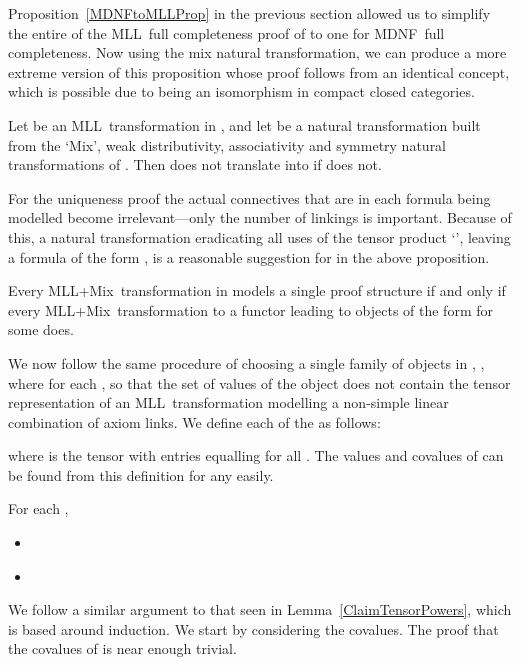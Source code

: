 \documentclass{LMCS}
\theoremstyle{plain}\newtheorem*{cLm}{Claim}
\newcommand{\mll}{MLL} \newcommand{\mall}{MALL}
\newcommand{\mllmix}{MLL+Mix} \newcommand{\GRel}{\mathbf{GRel}}
\newcommand{\p}{} \newcommand{\N}{\mathbb{N}}
\begin{document}
    \p Proposition~\ref{MDNFtoMLLProp} in the previous section allowed us to simplify the entire of the \mll~full completeness proof of  to one for MDNF~full completeness. Now using the mix natural transformation, we can produce a more extreme version of this proposition whose proof follows from an identical concept, which is possible due to  being an isomorphism in compact closed categories.
    \begin{prop} \label{MDNFMixToMLLProp}
    Let  be an \mll~transformation in , and let  be a natural transformation built from the `Mix', weak distributivity, associativity and symmetry natural transformations of . Then  does not translate into  if  does not.
    \end{prop}
    
    For the uniqueness proof the actual connectives that are in each formula being modelled become irrelevant---only the number of linkings is important. Because of this, a natural transformation eradicating all uses of the tensor product `', leaving a formula of the form , is a reasonable suggestion for  in the above proposition.
    
    \begin{cor} \label{AllParToMLLProp}
    Every \mllmix~transformation in  models a single proof structure if and only if every \mllmix~transformation to a functor leading to objects of the form  for some  does.
    \end{cor}
    
    We now follow the same procedure of choosing a single family of objects in , , where  for each , so that the set of values of the object  does not contain the tensor representation of an \mll~transformation modelling a non-simple linear combination of axiom links. We define each of the  as follows:
    
    where  is the tensor with entries equalling  for all . The values and covalues of  can be found from this definition for any  easily.
    
    \begin{lem} \label{ClaimMixObjectProperties}
    For each ,
    \begin{itemize}
    \item  \\ 
    \item 
    \end{itemize}
    \end{lem}
    \proof
    We follow a similar argument to that seen in Lemma~\ref{ClaimTensorPowers}, which is based around induction. We start by considering the covalues. The proof that the covalues of  is near enough trivial.
    
\end{document}
